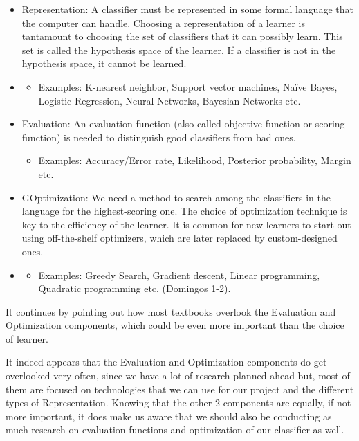 \documentclass[a4paper,12pt]{report}
\begin{document}
\begin{itemize}[,]
    \setlength\itemsep{-.1cm}
    \item Representation: A classifier must be represented in some formal language that the computer can handle. Choosing a representation of a learner is tantamount to choosing the set of classifiers that it can possibly learn. This set is called the hypothesis space of the learner. If a classifier is not in the hypothesis space, it cannot be learned.
    \vspace*{-2mm}
    \item \begin{itemize}[,]
        \setlength\itemsep{0cm}
        \item Examples: K-nearest neighbor, Support vector machines, Naïve Bayes, Logistic Regression, Neural Networks, Bayesian Networks etc.
    \end{itemize}
    \item Evaluation: An evaluation function (also called objective function or scoring function) is needed to distinguish good classifiers from bad ones.
    \vspace*{-2mm}
    \begin{itemize}[,]
        \setlength\itemsep{0cm}
        \item Examples: Accuracy/Error rate, Likelihood, Posterior probability, Margin etc.
    \end{itemize}
    \item GOptimization: We need a method to search among the classifiers in the language for the highest-scoring one. The choice of optimization technique is key to the efficiency of the learner. It is common for new learners to start out using off-the-shelf optimizers, which are later replaced by custom-designed ones.
    \vspace*{-2mm}
    \item \begin{itemize}[,]
        \setlength\itemsep{0cm}
        \item Examples: Greedy Search, Gradient descent, Linear programming, Quadratic programming etc. (Domingos 1-2).
    \end{itemize}
\end{itemize}

It continues by pointing out how most textbooks overlook the Evaluation and Optimization components, which could be even more important than the choice of learner.

It indeed appears that the Evaluation and Optimization components do get overlooked very often, since we have a lot of research planned ahead but, most of them are focused on technologies that we can use for our project and the different types of Representation. Knowing that the other 2 components are equally, if not more important, it does make us aware that we should also be conducting as much research on evaluation functions and optimization of our classifier as well.
\end{document}
